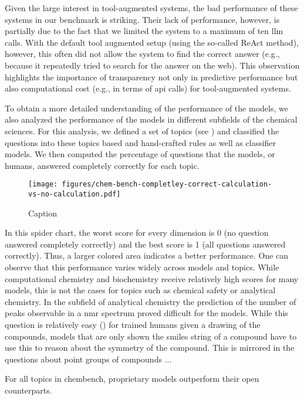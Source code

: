 \documentclass[11pt, oneside]{article}
\begin{document}
Given the large interest in tool-augmented systems, the bad performance of these systems in our benchmark is striking. 
Their lack of performance, however, is partially due to the fact that we limited the system to a maximum of ten \gls{llm} calls.
With the default tool augmented setup (using the so-called ReAct method), however, this often did not allow the system to find the correct answer (e.g., because it repeatedly tried to search for the answer on the web).
This observation highlights the importance of transparency not only in predictive performance but also computational cost (e.g., in terms of \gls{api} calls) for tool-augmented systems.

To obtain a more detailed understanding of the performance of the models, we also analyzed the performance of the models in different subfields of the chemical sciences.
For this analysis, we defined a set of topics (see ) and classified the questions into these topics based and hand-crafted rules as well as classifier models.
We then computed the percentage of questions that the models, or humans, answered completely correctly for each topic.

\begin{figure}
    \centering
    \texttt{[image: figures/chem-bench-completley-correct-calculation-vs-no-calculation.pdf]}
    \caption{Caption}
    \label{fig:performance_by_topic}
\end{figure}

In this spider chart, the worst score for every dimension is 0 (no question answered completely correctly) and the best score is 1 (all questions answered correctly). 
Thus, a larger colored area indicates a better performance. 
One can observe that this performance varies widely across models and topics. 
While computational chemistry and biochemistry receive relatively high scores for many models, this is not the cases for topics such as chemical safety or analytical chemistry.
In the subfield of analytical chemistry the prediction of the number of peaks observable in a \gls{nmr} spectrum proved difficult for the models. 
While this question is relatively easy () for trained humans given a drawing of the compounds, models that are only shown the \gls{smiles} string of a compound have to use this to reason about the symmetry of the compound. 
This is mirrored in the questions about point groups of compounds ... 

For all topics in chembench, proprietary models outperform their open counterparts.
\end{document}
